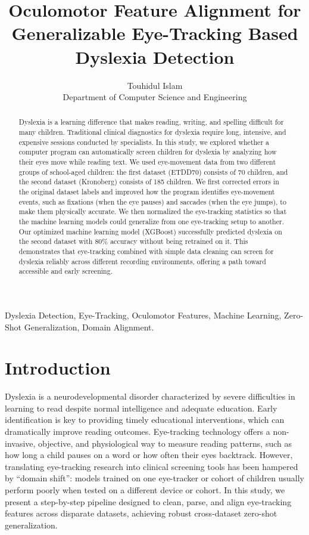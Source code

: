 \documentclass[journal]{IEEEtran}
\begin{document}
\title{Oculomotor Feature Alignment for Generalizable Eye-Tracking Based Dyslexia Detection}

\author{Touhidul Islam\\
Department of Computer Science and Engineering}

\maketitle

\begin{abstract}
Dyslexia is a learning difference that makes reading, writing, and spelling difficult for many children. Traditional clinical diagnostics for dyslexia require long, intensive, and expensive sessions conducted by specialists. In this study, we explored whether a computer program can automatically screen children for dyslexia by analyzing how their eyes move while reading text. We used eye-movement data from two different groups of school-aged children: the first dataset (ETDD70) consists of 70 children, and the second dataset (Kronoberg) consists of 185 children. We first corrected errors in the original dataset labels and improved how the program identifies eye-movement events, such as fixations (when the eye pauses) and saccades (when the eye jumps), to make them physically accurate. We then normalized the eye-tracking statistics so that the machine learning models could generalize from one eye-tracking setup to another. Our optimized machine learning model (XGBoost) successfully predicted dyslexia on the second dataset with 80\% accuracy without being retrained on it. This demonstrates that eye-tracking combined with simple data cleaning can screen for dyslexia reliably across different recording environments, offering a path toward accessible and early screening.
\end{abstract}

\begin{IEEEkeywords}
Dyslexia Detection, Eye-Tracking, Oculomotor Features, Machine Learning, Zero-Shot Generalization, Domain Alignment.
\end{IEEEkeywords}

\section{Introduction}
Dyslexia is a neurodevelopmental disorder characterized by severe difficulties in learning to read despite normal intelligence and adequate education. Early identification is key to providing timely educational interventions, which can dramatically improve reading outcomes. Eye-tracking technology offers a non-invasive, objective, and physiological way to measure reading patterns, such as how long a child pauses on a word or how often their eyes backtrack. However, translating eye-tracking research into clinical screening tools has been hampered by ``domain shift'': models trained on one eye-tracker or cohort of children usually perform poorly when tested on a different device or cohort. In this study, we present a step-by-step pipeline designed to clean, parse, and align eye-tracking features across disparate datasets, achieving robust cross-dataset zero-shot generalization.
\end{document}
